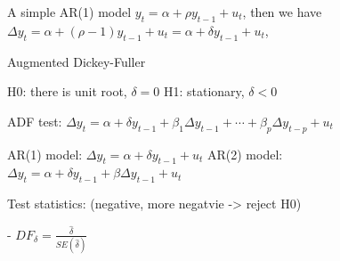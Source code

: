 \documentclass[11pt]{article}
\begin{document}
A simple AR(1) model $y_t = \alpha + \rho y_{t-1} + u_t$, then we have $\Delta y_t = \alpha + (\rho -1) y_{t-1} + u_t = \alpha + \delta y_{t-1} + u_t$, 

Augmented Dickey-Fuller 

H0: there is unit root, $\delta = 0$
H1: stationary, $\delta < 0$

ADF test: $\Delta y_t = \alpha + \delta y_{t-1} + \beta_1 \Delta y_{t-1} + \cdots + \beta_{p} \Delta y_{t-p} + u_t$

AR(1) model: $\Delta y_t = \alpha + \delta y_{t-1} + u_t$
AR(2) model: $\Delta y_t = \alpha + \delta y_{t-1} + \beta \Delta y_{t-1} + u_t$

Test statistics: (negative, more negatvie -> reject H0)

-  $DF_{\delta} = \frac{\hat{\delta}}{SE(\hat{\delta})}$
\end{document}
